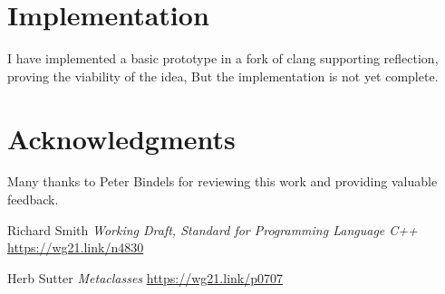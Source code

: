 \documentclass{wg21}
\begin{document}
\section{Implementation}

I have implemented a basic prototype in a fork of clang supporting reflection, proving the viability of the idea,
But the implementation is not yet complete. 


\section{Acknowledgments}

Many thanks to Peter Bindels for
reviewing this work and providing valuable feedback.

\begin{thebibliography}{9}
    
    Richard Smith
    \emph{Working Draft, Standard for Programming Language C++}\newline
    \url{https://wg21.link/n4830}
    
    Herb Sutter
    \emph{Metaclasses}\newline
    \url{https://wg21.link/p0707}
     
\end{thebibliography}
\end{document}
